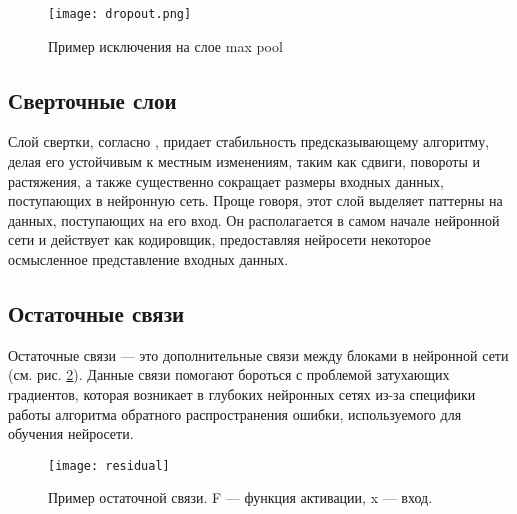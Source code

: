 \begin{figure}[!htb]
	\centering
	\texttt{[image: dropout.png]}
	\caption{Пример исключения на слое max pool}
	\label{fig:dropout}
\end{figure}

\subsection{Сверточные слои}

Слой свертки, согласно \cite{goodfellow}, придает стабильность предсказывающему
алгоритму, делая его устойчивым к местным изменениям, таким как сдвиги,
повороты и растяжения, а также существенно сокращает размеры входных данных,
поступающих в нейронную сеть. Проще говоря, этот слой выделяет паттерны на
данных, поступающих на его вход. Он располагается в самом начале нейронной сети
и действует как кодировщик, предоставляя нейросети некоторое осмысленное
представление входных данных.

\subsection{Остаточные связи}
Остаточные связи \cite{residual} --- это дополнительные связи между блоками
в нейронной сети (см. рис. \ref{fig:residual}). Данные связи помогают бороться с проблемой
затухающих градиентов, которая возникает в глубоких нейронных сетях из-за
специфики работы алгоритма обратного распространения ошибки, используемого для
обучения нейросети.

\begin{figure}[!htb]
	\centering
	\texttt{[image: residual]}
	\caption{Пример остаточной связи. F --- функция активации, x --- вход.}
	\label{fig:residual}
\end{figure}
